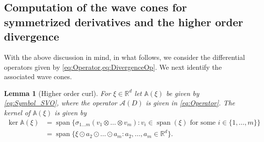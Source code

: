 \documentclass[a4paper, 10pt, twoside, notitlepage]{amsart}
\theoremstyle{plain}
\newtheorem{lem}[prop]{Lemma}
\newcommand{\R}{\mathbb{R}}
\newcommand{\A}{\mathcal{A}}
\renewcommand{\AA}{\mathbb{A}}
\DeclareMathOperator{\vspan}{span}
\begin{document}
          
	\subsection{Computation of the wave cones for symmetrized derivatives and the higher order divergence}
	\label{sec:symm_deriv}
	With the above discussion in mind, in what follows, we consider the differential operators given by \cref{eq:Operator,eq:DivergenceOp}.
		 We next identify the associated wave cones.
	
	\begin{lem}[Higher order curl] 
	\label{lem:WaveCone} 
	For $\xi \in \R^d$ let $\AA(\xi)$ be given by \cref{eq:Symbol_SVO}, where the operator $\A(D)$ is given in \cref{eq:Operator}.  The kernel of $\AA(\xi)$ is given by
		\begin{align*}
			\ker \AA(\xi) & = \vspan \Big\{ \sigma_{1 \dots m} (v_{1} \otimes \dots \otimes v_{m}): v_{i} \in \vspan(\xi) \text{ for some } i \in \{1,\dots,m\}\Big\} \\
			& = \vspan\Big\{ \xi \odot a_2 \odot \dots \odot a_m: a_2,\dots,a_m \in \R^d \Big\}.
		\end{align*}
	\end{lem}
	
\end{document}

